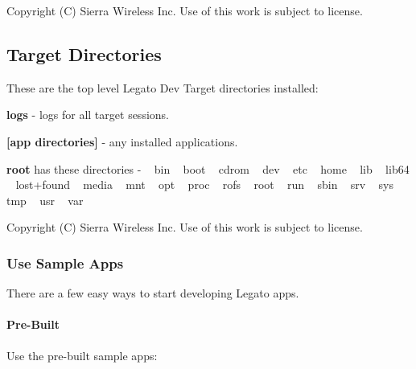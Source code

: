 Copyright (C) Sierra Wireless Inc. Use of this work is subject to license. \hypertarget{getstartedTargetDirs}{}\subsection{Target Directories}\label{getstartedTargetDirs}
These are the top level Legato Dev Target directories installed\+:

{\bfseries logs} -\/ logs for all target sessions.

{\bfseries \mbox{[}app directories\mbox{]} }-\/ any installed applications.

{\bfseries root } has these directories -\/ ~\newline
 bin ~\newline
 boot ~\newline
 cdrom ~\newline
 dev ~\newline
 etc ~\newline
 home ~\newline
 lib ~\newline
 lib64 ~\newline
 lost+found ~\newline
 media ~\newline
 mnt ~\newline
 opt ~\newline
 proc ~\newline
 rofs ~\newline
 root ~\newline
 run ~\newline
 sbin ~\newline
 srv ~\newline
 sys ~\newline
 tmp ~\newline
 usr ~\newline
 var ~\newline






Copyright (C) Sierra Wireless Inc. Use of this work is subject to license. \hypertarget{getstartedSampleApps}{}\subsubsection{Use Sample Apps}\label{getstartedSampleApps}
There are a few easy ways to start developing Legato apps.\hypertarget{getstarted_sample_apps_getstartedSampleApps_preBuilt}{}\paragraph{Pre-\/\+Built}\label{getstarted_sample_apps_getstartedSampleApps_preBuilt}
Use the pre-\/built sample apps\+: ~\newline

